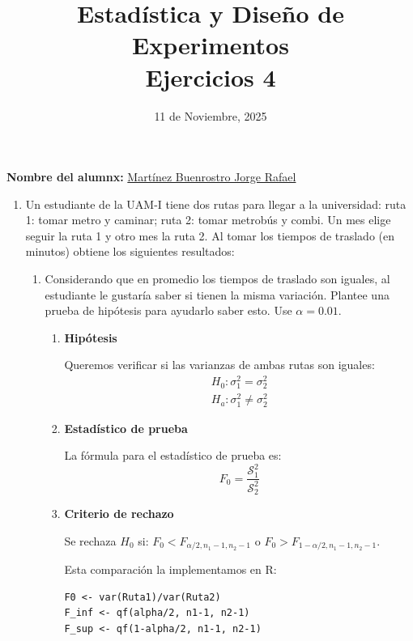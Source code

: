 \documentclass[12pt,a4paper]{article}
\title{Estadística y Diseño de Experimentos\\
Ejercicios 4}
\date{11 de Noviembre, 2025}
\author{}
\begin{document}
\maketitle

\noindent\textbf{Nombre del alumnx:} \underline{\hspace{0.5cm}Martínez Buenrostro Jorge Rafael\hspace{0.5cm}}

\vspace{1cm}

\begin{enumerate}
  \item Un estudiante de la UAM-I tiene dos rutas para llegar a la universidad: ruta 1: tomar metro y caminar; ruta 2: tomar metrobús y combi. Un mes elige seguir la ruta 1 y otro mes la ruta 2. Al tomar los tiempos de traslado (en minutos) obtiene los siguientes resultados:
  
  \begin{enumerate}
    \item Considerando que en promedio los tiempos de traslado son iguales, al estudiante le gustaría saber si tienen la misma variación. Plantee una prueba de hipótesis para ayudarlo saber esto. Use $\alpha=0.01$.
    
    \begin{enumerate}
      \item \textbf{Hipótesis}
      
      Queremos verificar si las varianzas de ambas rutas son iguales:
      \[
        \begin{array}{c}
          H_0 : \sigma_1^2 = \sigma_2^2 \\
          H_a : \sigma_1^2 \neq \sigma_2^2
        \end{array}
      \]

      \item \textbf{Estadístico de prueba}
      
      La fórmula para el estadístico de prueba es:
      \[
        F_0 = \frac{\mathcal{S}_1^2}{\mathcal{S}_2^2}
      \]
      
      \item \textbf{Criterio de rechazo}
      
      Se rechaza $H_0$ si: $F_0 < F_{\alpha/2, n_1-1, n_2-1}$ o $F_0 > F_{1-\alpha/2, n_1-1, n_2-1}$. 
      
      Esta comparación la implementamos en R:
      \begin{lstlisting}
F0 <- var(Ruta1)/var(Ruta2)
F_inf <- qf(alpha/2, n1-1, n2-1)
F_sup <- qf(1-alpha/2, n1-1, n2-1)
      \end{lstlisting}


\end{enumerate}
\end{enumerate}
\end{enumerate}
\end{document}

